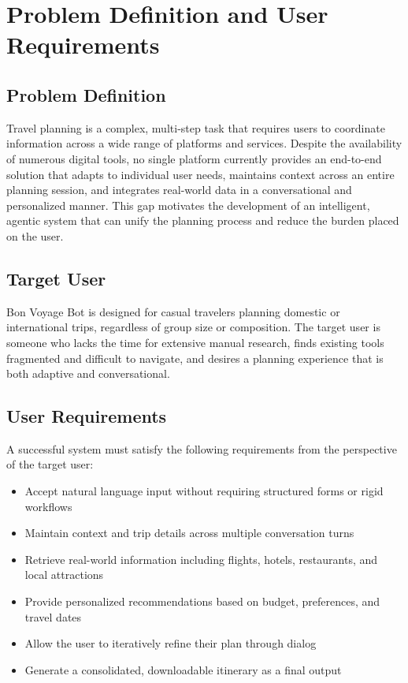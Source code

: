 \documentclass{article}
\begin{document}
\section{Problem Definition and User Requirements}
\label{sec:problem}

\subsection{Problem Definition}
Travel planning is a complex, multi-step task that requires users to coordinate information across a wide range of platforms and services. Despite the availability of numerous digital tools, no single platform currently provides an end-to-end solution that adapts to individual user needs, maintains context across an entire planning session, and integrates real-world data in a conversational and personalized manner. This gap motivates the development of an intelligent, agentic system that can unify the planning process and reduce the burden placed on the user. 

\subsection{Target User}
Bon Voyage Bot is designed for casual travelers planning domestic or international trips, regardless of group size or composition. The target user is someone who lacks the time for extensive manual research, finds existing tools fragmented and difficult to navigate, and desires a planning experience that is both adaptive and conversational.

\subsection{User Requirements}
A successful system must satisfy the following requirements from the perspective of the target user:
\begin{itemize}[noitemsep, topsep=0pt]
    \item Accept natural language input without requiring structured forms or rigid workflows
    \item Maintain context and trip details across multiple conversation turns
    \item Retrieve real-world information including flights, hotels, restaurants, and local attractions
    \item Provide personalized recommendations based on budget, preferences, and travel dates
    \item Allow the user to iteratively refine their plan through dialog
    \item Generate a consolidated, downloadable itinerary as a final output
\end{itemize}
\end{document}
